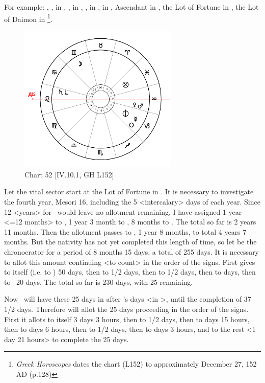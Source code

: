 For example: \Sun, \Mercury, in \Capricorn, \Saturn, \Jupiter\xspace in \Leo, \Mars, \Venus\xspace in \Aquarius, \Moon\xspace in \Gemini, Ascendant in \Leo, the Lot of Fortune in \Pisces, the Lot of Daimon in \Capricorn
\footnote{\textit{Greek Horoscopes} dates the chart (L152) to approximately December 27, 152 AD (p.128)}. 

\clearpage
\begin{figure}
\centering
\vspace{-20pt}
\includegraphics[width=0.68\textwidth]{charts/4_10_1}
\caption{Chart 52 [IV.10.1, GH L152]}
\label{fig:chart52}
\end{figure} 

Let the vital sector start at the Lot of Fortune in \Pisces. It is necessary to investigate the fourth year, Mesori 16,
including the 5 <intercalary> days of each year. Since 12 <years> for \Pisces\, would leave no allotment remaining, I have assigned 1 year <=12 months> to \Pisces, 1 year 3 month to \Aries, 8 months to \Taurus. The total so far is 2 years 11 months. Then the allotment passes to \Mercury, 1 year 8 months, to total 4 years 7 months. But the nativity has not yet completed this length of time, so let \Mercury\xspace be the chronocrator for a period of 8 months 15 days, a total of 255 days. It is necessary to allot this amount continuing <to count> in the order of the signs. First \Mercury\xspace gives to itself (i.e. to \Gemini) 50 days, then to \Cancer\xspace 62 1/2 days, then to \Leo\xspace 47 1/2 days, then to \Virgo\xspace 50 days, then to \Libra\,  20 days. The total so far is 230 days, with 25 remaining. 

Now \Mars\, will have these 25 days in \Scorpio\xspace after \Venus's days <in \Libra>, until the completion of 37 1/2 days. Therefore \Mars\xspace will allot the 25 days proceeding in the order of the signs. First it allots to itself 3 days 3 hours, then to \Sagittarius\xspace 2 1/2 days, then to
\Capricorn\xspace 5 days 15 hours, then to \Aquarius\xspace 6 days 6 hours, then to \Pisces\xspace 2 1/2 days, then to \Aries\xspace 3 days 3 hours, and to \Taurus\xspace the rest <1 day 21 hours> to complete the 25 days. 

